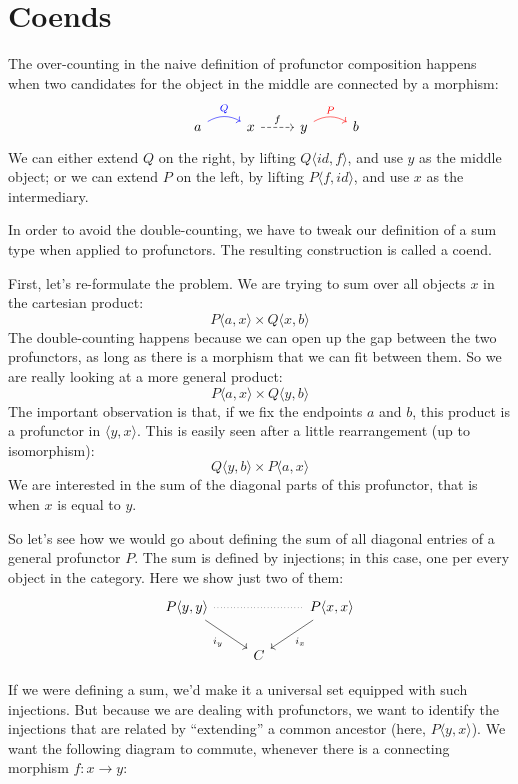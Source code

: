 \documentclass[DaoFP]{subfiles}
\begin{document}
\section{Coends}

The over-counting in the naive definition of profunctor composition happens when two candidates for the object in the middle are connected by a morphism:
\[
 \begin{tikzcd}
  & a
  \arrow[r, bend left, blue, "Q"]
  &x
  \arrow[r, dashed, "f"]
 & y
  \arrow[r, bend left, red, "P"]
 & b
  \end{tikzcd}
\]
We can either extend $Q$ on the right, by lifting $Q \langle id, f \rangle$, and use $y$ as the middle object; or we can extend $P$ on the left, by lifting $P \langle f, id \rangle$, and use $x$ as the intermediary.

In order to avoid the double-counting, we have to tweak our definition of a sum type when applied to profunctors. The resulting construction is called a coend. 

First, let's re-formulate the problem. We are trying to sum over all objects $x$ in the cartesian product:
\[ P \langle a, x \rangle \times Q \langle x, b \rangle \]
The double-counting happens because we can open up the gap between the two profunctors, as long as there is a morphism that we can fit between them. So we are really looking at a more general product:
\[ P \langle a, x \rangle \times Q \langle y, b \rangle \]
The important observation is that, if we fix the endpoints $a$ and $b$, this product is a profunctor in $\langle y, x \rangle$. This is easily seen after a little rearrangement (up to isomorphism):
\[ Q \langle y, b \rangle \times P \langle a, x \rangle \]
We are interested in the sum of the diagonal parts of this profunctor, that is when $x$ is equal to $y$. 

So let's see how we would go about defining the sum of all diagonal entries of a general profunctor $P$. The sum is defined by injections; in this case, one per every object in the category. Here we show just two of them:
\[
 \begin{tikzcd}
 P \langle y, y \rangle
 \arrow[dr, "i_y"']
 \arrow[rr, dash, dotted]
 &&P \langle x, x \rangle
 \arrow[dl, "i_x"]
 \\
 &C
 \end{tikzcd}
\]

If we were defining a sum, we'd make it a universal set equipped with such injections. But because we are dealing with profunctors, we want to identify the injections that are related by ``extending'' a common ancestor (here, $P \langle y, x \rangle$). We want the following diagram to commute, whenever there is a connecting morphism $f\colon x \to y$:
\end{document}
